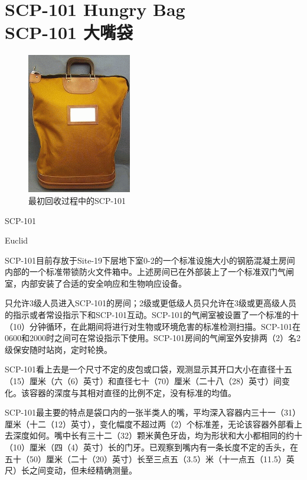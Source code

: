 \chapter[SCP-101 大嘴袋]{
    SCP-101 Hungry Bag\\
    SCP-101 大嘴袋
}

\label{chap:SCP-101}

\begin{figure}[H]
    \centering
    \includegraphics[max width=0.5\linewidth]{images/SCP-101.png}
    \caption*{最初回收过程中的SCP-101}
\end{figure}

SCP-101

Euclid

SCP-101目前存放于Site-19下层地下室0-2的一个标准设施大小的钢筋混凝土房间内部的一个标准带锁防火文件箱中。上述房间已在外部装上了一个标准双门气闸室，内部安装了合适的安全响应和生物响应设备。

只允许3级人员进入SCP-101的房间；2级或更低级人员只允许在3级或更高级人员的指示或者常设指示下和SCP-101互动。SCP-101的气闸室被设置了一个标准的十（10）分钟循环，在此期间将进行对生物或环境危害的标准检测扫描。SCP-101在0600和2000时之间可在常设指示下使用。SCP-101房间的气闸室外安排两（2）名2级保安随时站岗，定时轮换。

SCP-101看上去是一个尺寸不定的皮包或口袋，观测显示其开口大小在直径十五（15）厘米（六（6）英寸）和直径七十（70）厘米（二十八（28）英寸）间变化。该容器的深度与其相对直径的比例不定，没有标准的均值。

SCP-101最主要的特点是袋口内的一张半类人的嘴，平均深入容器内三十一（31）厘米（十二（12）英寸），变化幅度不超过两（2）个标准差，无论该容器外部看上去深度如何。嘴中长有三十二（32）颗米黄色牙齿，均为形状和大小都相同的约十（10）厘米（四（4）英寸）长的门牙。已观察到嘴内有一条长度不定的舌头，在五十（50）厘米（二十（20）英寸）长至三点五（3.5）米（十一点五（11.5）英尺）长之间变动，但未经精确测量。

